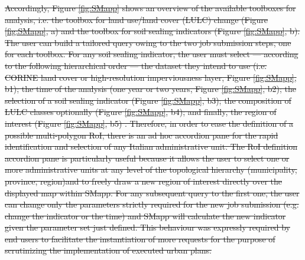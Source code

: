 \documentclass[APA,LATO1COL,doublespace]{WileyNJD-v2}
\providecommand{\DIFdeltex}[1]{{\protect\color{red}\sout{#1}}}                      %
\providecommand{\DIFdel}[1]{\texorpdfstring{\DIFdeltex{#1}}{}} %
\begin{document}
\DIFdel{Accordingly, Figure \ref{fig:SMapp} shows an overview of the available toolboxes for analysis, i.e. the toolbox for land use/land cover (LULC) change (Figure \ref{fig:SMapp}, a) and the toolbox for soil sealing indicators (Figure \ref{fig:SMapp}, b).
The user can build a tailored query owing to the two job submission steps, one for each toolbox. 
For any soil sealing indicator, the user must select --- according to the following hierarchical order --- the dataset they intend to use (i.e. CORINE land cover or high-resolution imperviousness layer, Figure \ref{fig:SMapp}, b1); the time of the analysis (one year or two years, Figure \ref{fig:SMapp}, b2); the selection of a soil sealing indicator (Figure \ref{fig:SMapp}, b3); the composition of LULC classes optionally (Figure \ref{fig:SMapp}, b4); and finally, the region of interest (Figure \ref{fig:SMapp}, b5) 
. Therefore, in order to ease the definition of a possible multi-polygon RoI, there is an ad hoc accordion pane for the rapid identification and selection of any Italian administrative unit.
The RoI definition accordion pane is particularly useful because it allows the user to select one or more administrative units at any level of the topological hierarchy (municipality, province, region)and to freely draw a new region of interest directly over the displayed map within SMapp.
For any subsequent query to the first one, the user can change only the parameters strictly required for the new job submission (e.g. change the indicator or the time) and SMapp will calculate the new indicator given the parameter set just defined. 
This behaviour was expressly required by end users to facilitate the instantiation of more requests for the purpose of scrutinizing the implementation of executed urban plans.
}%
\end{document}
